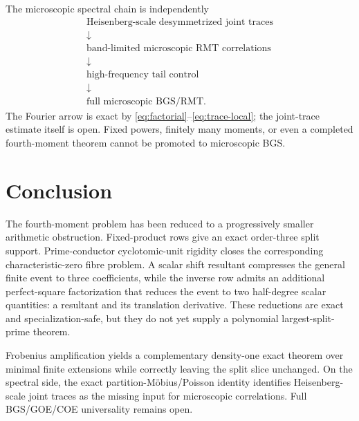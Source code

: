 \documentclass[11pt]{article}
\begin{document}
The microscopic spectral chain is independently
\[
\begin{gathered}
\boxed{\text{Heisenberg-scale desymmetrized joint traces}}
\\ \downarrow \\
\boxed{\text{band-limited microscopic RMT correlations}}
\\ \downarrow \\
\boxed{\text{high-frequency tail control}}
\\ \downarrow \\
\boxed{\text{full microscopic BGS/RMT}}.
\end{gathered}
\]
The Fourier arrow is exact by \eqref{eq:factorial}--\eqref{eq:trace-local}; the
joint-trace estimate itself is open.  Fixed powers, finitely many moments, or
even a completed fourth-moment theorem cannot be promoted to microscopic BGS.

\section{Conclusion}

The fourth-moment problem has been reduced to a progressively smaller
arithmetic obstruction.  Fixed-product rows give an exact order-three split
support.  Prime-conductor cyclotomic-unit rigidity closes the corresponding
characteristic-zero fibre problem.  A scalar shift resultant compresses the
general finite event to three coefficients, while the inverse row admits an
additional perfect-square factorization that reduces the event to two
half-degree scalar quantities: a resultant and its translation derivative.
These reductions are exact and specialization-safe, but they do not yet supply
a polynomial largest-split-prime theorem.

Frobenius amplification yields a complementary density-one exact theorem over
minimal finite extensions while correctly leaving the split slice unchanged.
On the spectral side, the exact partition-M\"obius/Poisson identity identifies
Heisenberg-scale joint traces as the missing input for microscopic
correlations.  Full BGS/GOE/COE universality remains open.



\end{document}
